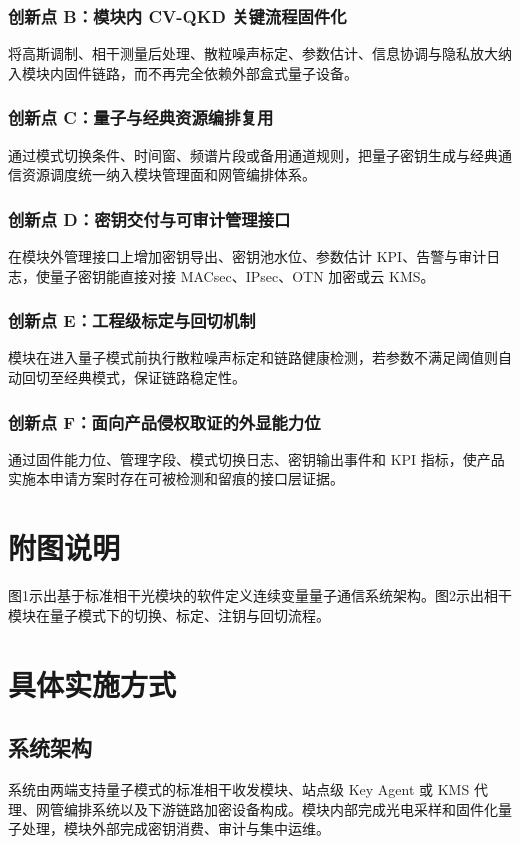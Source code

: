 ﻿\documentclass[12pt,a4paper]{article}
\begin{document}
\subsubsection{创新点 B：模块内 CV-QKD 关键流程固件化}
将高斯调制、相干测量后处理、散粒噪声标定、参数估计、信息协调与隐私放大纳入模块内固件链路，而不再完全依赖外部盒式量子设备。

\subsubsection{创新点 C：量子与经典资源编排复用}
通过模式切换条件、时间窗、频谱片段或备用通道规则，把量子密钥生成与经典通信资源调度统一纳入模块管理面和网管编排体系。

\subsubsection{创新点 D：密钥交付与可审计管理接口}
在模块外管理接口上增加密钥导出、密钥池水位、参数估计 KPI、告警与审计日志，使量子密钥能直接对接 MACsec、IPsec、OTN 加密或云 KMS。

\subsubsection{创新点 E：工程级标定与回切机制}
模块在进入量子模式前执行散粒噪声标定和链路健康检测，若参数不满足阈值则自动回切至经典模式，保证链路稳定性。

\subsubsection{创新点 F：面向产品侵权取证的外显能力位}
通过固件能力位、管理字段、模式切换日志、密钥输出事件和 KPI 指标，使产品实施本申请方案时存在可被检测和留痕的接口层证据。

\section{附图说明}
图1示出基于标准相干光模块的软件定义连续变量量子通信系统架构。图2示出相干模块在量子模式下的切换、标定、注钥与回切流程。

\section{具体实施方式}
\subsection{系统架构}
系统由两端支持量子模式的标准相干收发模块、站点级 Key Agent 或 KMS 代理、网管编排系统以及下游链路加密设备构成。模块内部完成光电采样和固件化量子处理，模块外部完成密钥消费、审计与集中运维。
\end{document}
